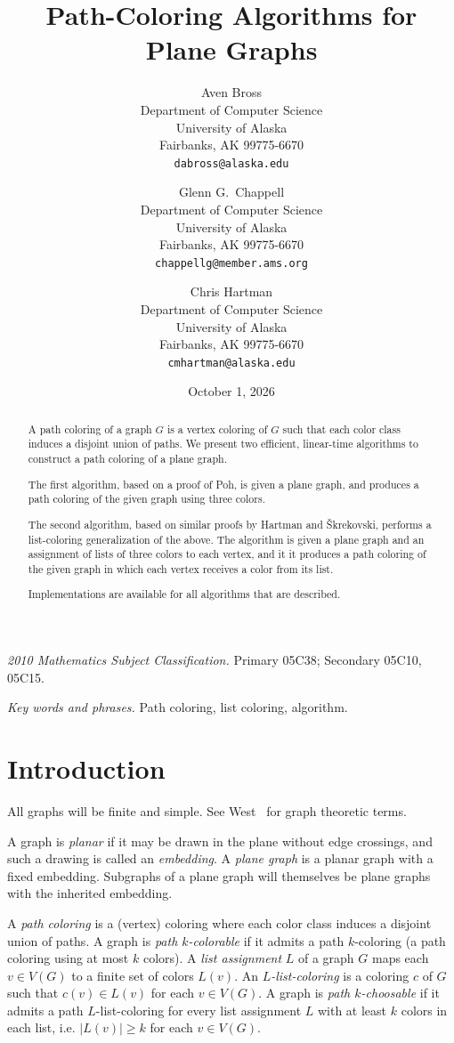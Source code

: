 \documentclass[12pt,letterpaper]{article}
\date{October 1, 2026}
\title{Path-Coloring Algorithms for Plane Graphs}
\author{Aven Bross\\
\small Department of Computer Science\\
\small University of Alaska\\
\small Fairbanks, AK 99775-6670\\
\small\texttt{dabross@alaska.edu} \and
Glenn G.~Chappell\\
\small Department of Computer Science\\
\small University of Alaska\\
\small Fairbanks, AK 99775-6670\\
\small\texttt{chappellg{@}member.ams.org} \and
Chris Hartman\\
\small Department of Computer Science\\
\small University of Alaska\\
\small Fairbanks, AK 99775-6670\\
\small\texttt{cmhartman{@}alaska.edu}}
\theoremstyle{plain}
\theoremstyle{definition}
\theoremstyle{break}
\newcommand{\defterm}[1]{\emph{#1}} %
\newcommand{\abstdefterm}[1]{#1} %
\begin{document}
\maketitle
\centerline{\small \textit{2010 Mathematics Subject Classification.}
 Primary 05C38; Secondary 05C10, 05C15.}
\centerline{\small \textit{Key words and phrases.}
 Path coloring, list coloring, algorithm.}

\begin{abstract}
A \abstdefterm{path coloring} of a graph $G$ is a vertex coloring
of $G$ such that each color class induces a disjoint union of paths.
We present two efficient, linear-time algorithms
to construct a path coloring of a plane graph.

The first algorithm, based on a proof of Poh, %
is given a plane graph, and
produces a path coloring of the given graph
using three colors.

The second algorithm,
based on similar proofs
by Hartman %
and \v{S}krekovski, %
performs a list-coloring generalization of the above.
The algorithm is given a plane graph and an assignment of lists of
three colors to each vertex, and it
it produces a path coloring of the given graph
in which each vertex receives a color from its list.

Implementations are available for all algorithms that are described.
\end{abstract}

\section{Introduction}

All graphs will be finite and simple. See West~\cite{Wes2000}
for graph theoretic terms.

A graph is
\defterm{planar} if it may be drawn in the plane without edge
crossings, and such a drawing is called an \defterm{embedding}.
A \defterm{plane graph} is a planar graph with a fixed embedding.
Subgraphs of a plane graph will themselves be plane graphs with
the inherited embedding.

A \defterm{path coloring}
is a (vertex) coloring where each color class induces a disjoint union of
paths.
A graph is \defterm{path $k$-colorable} if it
admits a path $k$-coloring (a path coloring using at most $k$ colors).
A \defterm{list assignment}
$L$ of a graph $G$ maps each $v\in V(G)$ to a finite set of colors $L(v)$.
An \defterm{$L$-list-coloring} is a
coloring $c$ of $G$ such that $c(v)\in L(v)$ for each $v\in V(G)$.
A graph is \defterm{path $k$-choosable} if it admits a path $L$-list-coloring
for every list assignment $L$ with at least $k$ colors in each list,
i.e. $|L(v)|\ge k$ for each $v\in V(G)$.
\end{document}
